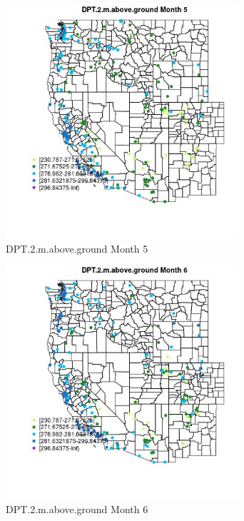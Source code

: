 \begin{figure} 
\centering  
\includegraphics[width=0.77\textwidth]{Code_Outputs/Report_ML_input_PM25_Step4_part_e_de_duplicated_aveswNAs_MapObsMo5DPT2maboveground.jpg} 
\caption{\label{fig:Report_ML_input_PM25_Step4_part_e_de_duplicated_aveswNAsMapObsMo5DPT2maboveground}DPT.2.m.above.ground Month 5} 
\end{figure} 
 

\begin{figure} 
\centering  
\includegraphics[width=0.77\textwidth]{Code_Outputs/Report_ML_input_PM25_Step4_part_e_de_duplicated_aveswNAs_MapObsMo6DPT2maboveground.jpg} 
\caption{\label{fig:Report_ML_input_PM25_Step4_part_e_de_duplicated_aveswNAsMapObsMo6DPT2maboveground}DPT.2.m.above.ground Month 6} 
\end{figure} 
 

